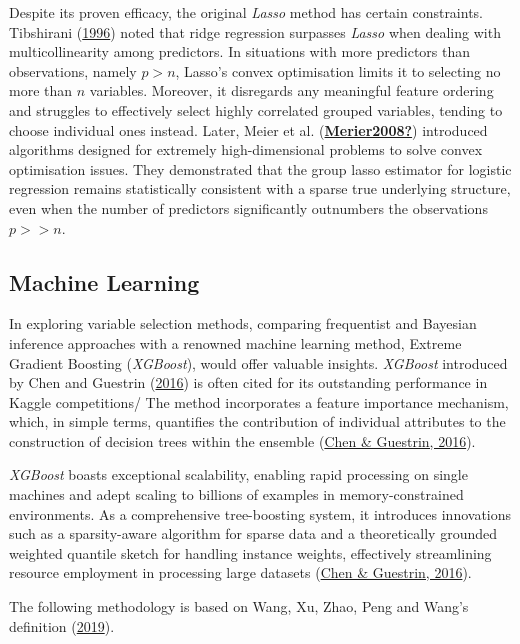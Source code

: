 \documentclass[
  11pt,
]{article}
\begin{document}
Despite its proven efficacy, the original \emph{Lasso} method has
certain constraints. Tibshirani
(\protect\hyperlink{ref-Tibshirani1996}{1996}) noted that ridge
regression surpasses \emph{Lasso} when dealing with multicollinearity
among predictors. In situations with more predictors than observations,
namely \(p > n\), Lasso's convex optimisation limits it to selecting no
more than \(n\) variables. Moreover, it disregards any meaningful
feature ordering and struggles to effectively select highly correlated
grouped variables, tending to choose individual ones instead. Later,
Meier et al. (\protect\hyperlink{ref-Merier2008}{\textbf{Merier2008?}})
introduced algorithms designed for extremely high-dimensional problems
to solve convex optimisation issues. They demonstrated that the group
lasso estimator for logistic regression remains statistically consistent
with a sparse true underlying structure, even when the number of
predictors significantly outnumbers the observations \(p >> n\).

\subsection{Machine Learning}

In exploring variable selection methods, comparing frequentist and
Bayesian inference approaches with a renowned machine learning method,
Extreme Gradient Boosting (\emph{XGBoost}), would offer valuable
insights. \emph{XGBoost} introduced by Chen and Guestrin
(\protect\hyperlink{ref-Chen2016}{2016}) is often cited for its
outstanding performance in Kaggle competitions/ The method incorporates
a feature importance mechanism, which, in simple terms, quantifies the
contribution of individual attributes to the construction of decision
trees within the ensemble (\protect\hyperlink{ref-Chen2016}{Chen \&
Guestrin, 2016}).

\emph{XGBoost} boasts exceptional scalability, enabling rapid processing
on single machines and adept scaling to billions of examples in
memory-constrained environments. As a comprehensive tree-boosting
system, it introduces innovations such as a sparsity-aware algorithm for
sparse data and a theoretically grounded weighted quantile sketch for
handling instance weights, effectively streamlining resource employment
in processing large datasets (\protect\hyperlink{ref-Chen2016}{Chen \&
Guestrin, 2016}).

The following methodology is based on Wang, Xu, Zhao, Peng and Wang's
definition (\protect\hyperlink{ref-Wang2019}{2019}).
\end{document}
